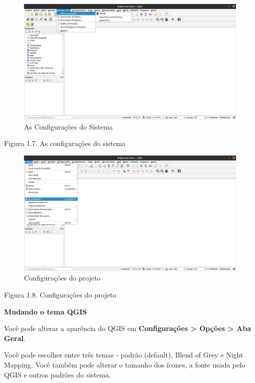 \documentclass[
  portuguese,
]{krantz}
\begin{document}
\begin{figure}
\centering
\includegraphics{media/modulo1/settings-1.png}
\caption{As Configurações do Sistema}
\end{figure}

Figura 1.7. As configurações do sistema

\begin{figure}
\centering
\includegraphics{media/modulo1/settings-2.png}
\caption{Configurações do projeto}
\end{figure}

Figura 1.8. Configurações do projeto

\textbf{Mudando o tema QGIS}

Você pode alterar a aparência do QGIS em \textbf{Configurações \textgreater{} Opções \textgreater{} Aba Geral}.

Você pode escolher entre três temas - padrão (default), Blend of Grey e Night Mapping. Você também pode alterar o tamanho dos ícones, a fonte usada pelo QGIS e outros padrões do sistema.
\end{document}

